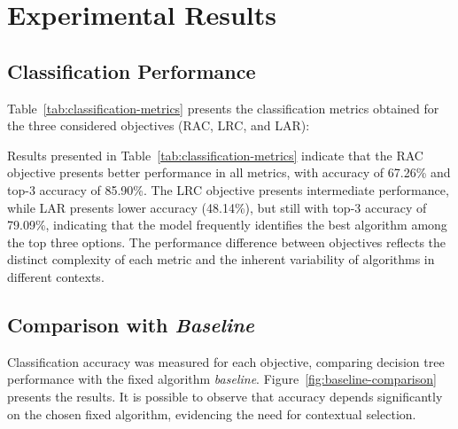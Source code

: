 \documentclass[a4paper,twoside]{article}
\begin{document}
\section{Experimental Results}
\label{sec:Results}

\subsection{Classification Performance}

Table~\ref{tab:classification-metrics} presents the classification metrics obtained for the three considered objectives (RAC, LRC, and LAR):

\begin{table}[H]
\centering
{}
\caption{Classification Metrics by Objective (Balanced Models)}
\label{tab:classification-metrics}
\end{table}

Results presented in Table~\ref{tab:classification-metrics} indicate that the RAC objective presents better performance in all metrics, with accuracy of 67.26\% and top-3 accuracy of 85.90\%. The LRC objective presents intermediate performance, while LAR presents lower accuracy (48.14\%), but still with top-3 accuracy of 79.09\%, indicating that the model frequently identifies the best algorithm among the top three options. The performance difference between objectives reflects the distinct complexity of each metric and the inherent variability of algorithms in different contexts.

\subsection{Comparison with \textit{Baseline}}

Classification accuracy was measured for each objective, comparing decision tree performance with the fixed algorithm \textit{baseline}. Figure~\ref{fig:baseline-comparison} presents the results. It is possible to observe that accuracy depends significantly on the chosen fixed algorithm, evidencing the need for contextual selection.
\end{document}
